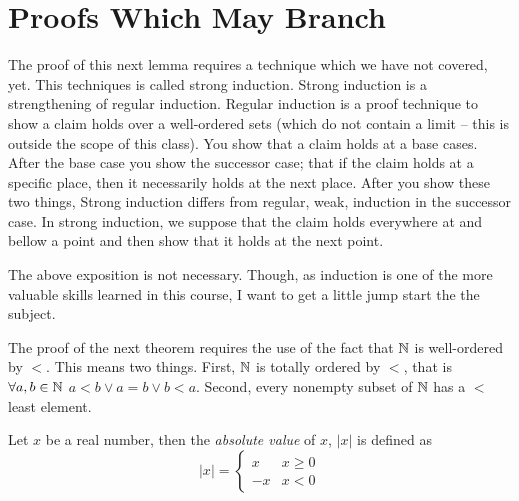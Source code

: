 \guard
\section{Proofs Which May Branch}
\label{sec:proofsWhichMayBranch}




The proof of this next lemma requires a technique which we have not covered, yet.
This techniques is called strong induction.
Strong induction is a strengthening of regular induction.
Regular induction is a proof technique to show a claim holds over a well-ordered sets (which do not contain a limit -- this is outside the scope of this class).
You show that a claim holds at a base cases.
After the base case you show the successor case; that if the claim holds at a specific place, then it necessarily holds at the next place.
After you show these two things,
Strong induction differs from regular, weak, induction in the successor case.
In strong induction, we suppose that the claim holds everywhere at and bellow a point and then show that it holds at the next point.

The above exposition is not necessary.
Though, as induction is one of the more valuable skills learned in this course, I want to get a little jump start the the subject.


The proof of the next theorem requires the use of the fact that $\mathbb{N}$ is well-ordered by $<$.
This means two things.
First, $\mathbb{N}$ is totally ordered by $<$, that is $\forall a,b\in\mathbb{N}$ $a<b\vee a=b\vee b<a$.
Second, every nonempty subset of $\mathbb{N}$ has a $<$ least element.










\begin{defn}
\label{defn:absoluteValue}
  Let $x$ be a real number, then the \emph{absolute value} of $x$, $\vert x\vert$ is defined as
  \[ \vert x\vert = \begin{cases}
      x & x\geq 0 \\
      -x& x < 0
   \end{cases} \]
\end{defn}

